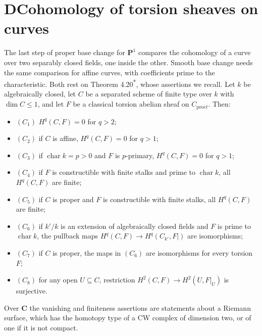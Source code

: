 \documentclass[11pt]{article}
\newcommand{\bpout}[1]{#1\textsuperscript{\hyperlink{bp-outside}{\ensuremath{\ast}}}}
\begin{document}
\section*{\texorpdfstring{D\quad Cohomology of torsion sheaves on curves}{D Cohomology of torsion sheaves on curves}}
\label{bp172}%
\label{bp173}%
The last step of proper base change for \(\mathbf P^1\) compares the cohomology of a curve over two separably closed fields, one inside the other. Smooth base change needs the same comparison for affine curves, with coefficients prime to the characteristic. Both rest on Theorem \bpout{4.20}, whose assertions we recall. Let \(k\) be algebraically closed, let \(C\) be a separated scheme of finite type over \(k\) with \(\dim C\leq1\), and let \(F\) be a classical torsion abelian sheaf on \(C_{\mathrm{pro}\acute{e}t}\). Then:

\begin{itemize}
\item \((C_{1})\) \(H^q(C,F)=0\) for \(q>2\);
\item \((C_{2})\) if \(C\) is affine, \(H^q(C,F)=0\) for \(q>1\);
\item \((C_{3})\) if \(\operatorname{char}k=p>0\) and \(F\) is \(p\)-primary, \(H^q(C,F)=0\) for \(q>1\);
\item \((C_{4})\) if \(F\) is constructible with finite stalks and prime to \(\operatorname{char}k\), all \(H^q(C,F)\) are finite;
\item \((C_{5})\) if \(C\) is proper and \(F\) is constructible with finite stalks, all \(H^q(C,F)\) are finite;
\item \((C_{6})\) if \(k'/k\) is an extension of algebraically closed fields and \(F\) is prime to \(\operatorname{char}k\), the pullback maps \(H^q(C,F)\to H^q(C_{k'},F|)\) are isomorphisms;
\item \((C_{7})\) if \(C\) is proper, the maps in \((C_6)\) are isomorphisms for every torsion \(F\);
\item \((C_{8})\) for any open \(U\subseteq C\), restriction \(H^2(C,F)\to H^2(U,F|_U)\) is surjective.
\end{itemize}

Over \(\mathbf C\) the vanishing and finiteness assertions are statements about a Riemann surface, which has the homotopy type of a CW complex of dimension two, or of one if it is not compact.
\end{document}
